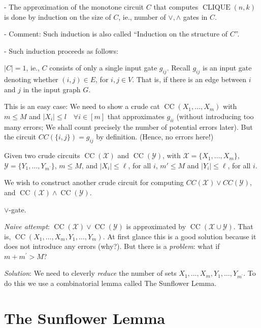 - The approximation of the monotone circuit $C$ that computes $\operatorname{CLIQUE}(n, k)$ is done by induction on the size of $C$, ie., number of $\lor, \wedge$ gates in $C$.


- Comment: Such induction is also called ``Induction on the structure of $C$''.

- Such induction proceeds as follows: 


 $|C|=1$, ie., $C$ consists of only a single input gate $g_{ij}$. Recall $g_{i j}$ is an input gate denoting whether $(i, j) \in E$, for $i, j \in V$.
That is, if there is an edge between $i$ and $j$ in the input graph $G$.

This is an easy case: We need to show a crude cat $\operatorname{CC}\left(X_1, \ldots, X_m\right)$ with $m \leqslant M$ and $\left|X_i\right| \leqslant l \quad \forall i \in[m]$ that
approximates $g_{i i}$ (without introducing too many errors; We shall count precisely the number of potential errors later).
But the circuit $C C(\{i, j\})=g_{i j}$ by definition. (Hence, no errors here!)


Given two crude circuits
$\operatorname{CC}(\mathcal X)$ and 
$\operatorname{CC}(\mathcal Y) 
$, with $\mathcal{X}=\{X_1, \ldots, X_m\}$, 
$\mathcal{Y}=\{Y_1, \ldots, Y_{m^{\prime}}\}$, $m\le M$, and $\left|X_i\right| \leq \ell $, for all $i$, $m'\le M $ and $\left|Y_i\right| \leq \ell$, for all $i$.


We wish to construct another crude circuit  for computing $CC(\mathcal{X}) \vee CC(\mathcal{Y})$, and $\operatorname{CC}(\mathcal X) \wedge 
\operatorname{CC}(\mathcal Y)$.

$\lor$-gate.

\textit{Naive attempt}: $\operatorname{CC}(\mathcal X)
\lor \operatorname{CC}(\mathcal Y)$ is approximated by $\operatorname{CC}(\mathcal X \cup \mathcal Y)$. That is, $\operatorname{CC}\left(X_1, \ldots, X_m, Y_1, \ldots, Y_m\right)$. At first glance this is a good solution because it does not introduce any errors (why?). But there is a \textit{problem}: what if $m+m^{\prime}>M$?


\textit{Solution}: We need to cleverly \emph{reduce} the number of sets $X_1, \ldots, X_m, Y_1, \ldots, Y_{m^{\prime}}$. To do this we use a combinatorial lemma called The Sunflower Lemma.





\section{The Sunflower Lemma}

